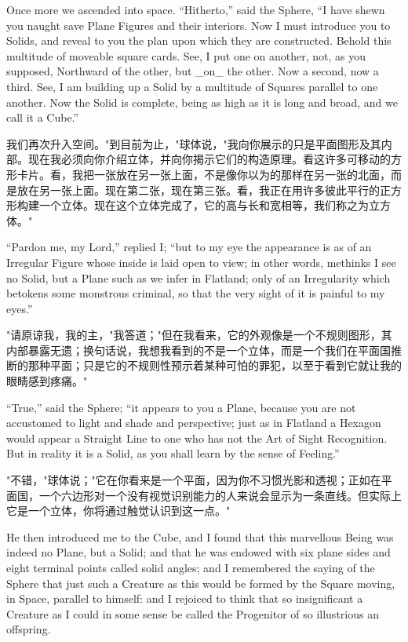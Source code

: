 \documentclass[12pt,UTF8]{ctexbook}
\begin{document}
Once more we ascended into space. ``Hitherto,'' said the Sphere, ``I have shewn you naught save Plane Figures and their interiors. Now I must introduce you to Solids, and reveal to you the plan upon which they are constructed. Behold this multitude of moveable square cards. See, I put one on another, not, as you supposed, Northward of the other, but \_on\_ the other. Now a second, now a third. See, I am building up a Solid by a multitude of Squares parallel to one another. Now the Solid is complete, being as high as it is long and broad, and we call it a Cube.''

我们再次升入空间。"到目前为止，"球体说，"我向你展示的只是平面图形及其内部。现在我必须向你介绍立体，并向你揭示它们的构造原理。看这许多可移动的方形卡片。看，我把一张放在另一张上面，不是像你以为的那样在另一张的北面，而是放在另一张上面。现在第二张，现在第三张。看，我正在用许多彼此平行的正方形构建一个立体。现在这个立体完成了，它的高与长和宽相等，我们称之为立方体。"

``Pardon me, my Lord,'' replied I; ``but to my eye the appearance is as of an Irregular Figure whose inside is laid open to view; in other words, methinks I see no Solid, but a Plane such as we infer in Flatland; only of an Irregularity which betokens some monstrous criminal, so that the very sight of it is painful to my eyes.''

"请原谅我，我的主，"我答道；"但在我看来，它的外观像是一个不规则图形，其内部暴露无遗；换句话说，我想我看到的不是一个立体，而是一个我们在平面国推断的那种平面；只是它的不规则性预示着某种可怕的罪犯，以至于看到它就让我的眼睛感到疼痛。"

``True,'' said the Sphere; ``it appears to you a Plane, because you are not accustomed to light and shade and perspective; just as in Flatland a Hexagon would appear a Straight Line to one who has not the Art of Sight Recognition. But in reality it is a Solid, as you shall learn by the sense of Feeling.''

"不错，"球体说；"它在你看来是一个平面，因为你不习惯光影和透视；正如在平面国，一个六边形对一个没有视觉识别能力的人来说会显示为一条直线。但实际上它是一个立体，你将通过触觉认识到这一点。"

He then introduced me to the Cube, and I found that this marvellous Being was indeed no Plane, but a Solid; and that he was endowed with six plane sides and eight terminal points called solid angles; and I remembered the saying of the Sphere that just such a Creature as this would be formed by the Square moving, in Space, parallel to himself: and I rejoiced to think that so insignificant a Creature as I could in some sense be called the Progenitor of so illustrious an offspring.
\end{document}
